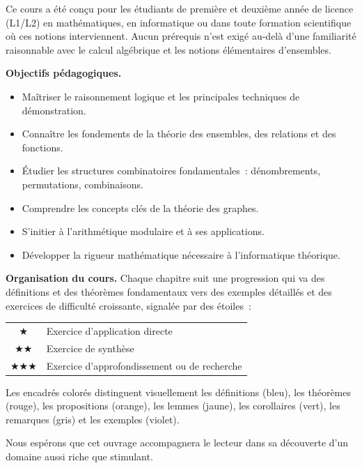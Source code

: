 \documentclass[12pt,a4paper,openany]{book}
\theoremstyle{definition}
\theoremstyle{plain}
\theoremstyle{remark}
\begin{document}
Ce cours a \'et\'e con\c{c}u pour les \'etudiants de premi\`ere et deuxi\`eme ann\'ee de licence (L1/L2) en math\'ematiques, en informatique ou dans toute formation scientifique o\`u ces notions interviennent. Aucun pr\'erequis n'est exig\'e au-del\`a d'une familiarit\'e raisonnable avec le calcul alg\'ebrique et les notions \'el\'ementaires d'ensembles.

\medskip
\noindent\textbf{Objectifs p\'edagogiques.}
\begin{itemize}[leftmargin=2em]
  \item Ma\^itriser le raisonnement logique et les principales techniques de d\'emonstration.
  \item Conna\^itre les fondements de la th\'eorie des ensembles, des relations et des fonctions.
  \item \'Etudier les structures combinatoires fondamentales~: d\'enombrements, permutations, combinaisons.
  \item Comprendre les concepts cl\'es de la th\'eorie des graphes.
  \item S'initier \`a l'arithm\'etique modulaire et \`a ses applications.
  \item D\'evelopper la rigueur math\'ematique n\'ecessaire \`a l'informatique th\'eorique.
\end{itemize}

\medskip
\noindent\textbf{Organisation du cours.}
Chaque chapitre suit une progression qui va des d\'efinitions et des th\'eor\`emes fondamentaux vers des exemples d\'etaill\'es et des exercices de difficult\'e croissante, signal\'ee par des \'etoiles~:
\begin{center}
\begin{tabular}{cl}
  $\bigstar$ & Exercice d'application directe \\
  $\bigstar\bigstar$ & Exercice de synth\`ese \\
  $\bigstar\bigstar\bigstar$ & Exercice d'approfondissement ou de recherche \\
\end{tabular}
\end{center}

Les encadr\'es color\'es distinguent visuellement les d\'efinitions (bleu), les th\'eor\`emes (rouge), les propositions (orange), les lemmes (jaune), les corollaires (vert), les remarques (gris) et les exemples (violet).

\bigskip
\noindent Nous esp\'erons que cet ouvrage accompagnera le lecteur dans sa d\'ecouverte d'un domaine aussi riche que stimulant.
\end{document}
